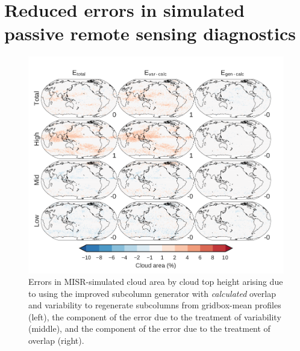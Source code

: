 \section{Reduced errors in simulated passive remote sensing
diagnostics}\label{sec:subgrid2Passive}

\begin{figure}[htbp]
\centering
\includegraphics{graphics/subgrid2_cldmisr_maps_gen-var-calc_diff.pdf}
\caption{\label{fig:cldmisrMapsCalcDiff}Errors in MISR-simulated cloud
area by cloud top height arising due to using the improved subcolumn
generator with \emph{calculated} overlap and variability to regenerate
subcolumns from gridbox-mean profiles (left), the component of the error
due to the treatment of variability (middle), and the component of the
error due to the treatment of overlap
(right).}\label{fig:cldmisrMapsCalcDiff}
\end{figure}

